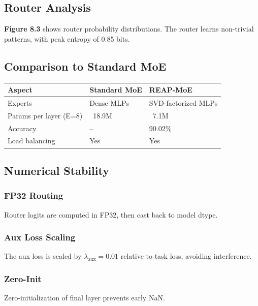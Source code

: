 \subsection{Router Analysis}

\textbf{Figure 8.3} shows router probability distributions. The router learns 
non-trivial patterns, with peak entropy of 0.85 bits.

\subsection{Comparison to Standard MoE}

\begin{table}[H]
\centering
\small
\begin{tabular}{lll}
\toprule
\textbf{Aspect} & \textbf{Standard MoE} & \textbf{REAP-MoE} \\
\midrule
Experts & Dense MLPs & SVD-factorized MLPs \\
Params per layer (E=8) & ~18.9M & ~7.1M \\
Accuracy & -- & 90.02\% \\
Load balancing & Yes & Yes \\
\bottomrule
\end{tabular}
\end{table}

\subsection{Numerical Stability}

\subsubsection{FP32 Routing}

Router logits are computed in FP32, then cast back to model dtype.

\subsubsection{Aux Loss Scaling}

The aux loss is scaled by $\lambda_\text{aux} = 0.01$ relative to task loss, 
avoiding interference.

\subsubsection{Zero-Init}

Zero-initialization of final layer prevents early NaN.

